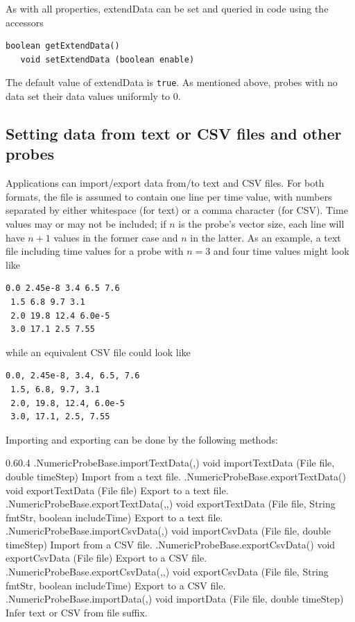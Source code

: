 As with all properties, {\sf extendData} can be set and queried in code using
the accessors
\begin{lstlisting}[]
   boolean getExtendData()
   void setExtendData (boolean enable)
\end{lstlisting}
%
The default value of {\sf extendData} is {\tt true}.  As mentioned above,
probes with no data set their data values uniformly to 0.

\subsection{Setting data from text or CSV files and other probes}

Applications can import/export data from/to text and CSV files.  For both
formats, the file is assumed to contain one line per time value, with numbers
separated by either whitespace (for text) or a comma character (for CSV). Time
values may or may not be included; if $n$ is the probe's vector size, each line
will have $n+1$ values in the former case and $n$ in the latter.  As an
example, a text file including time values for a probe with $n = 3$ and four
time values might look like
%
\begin{lstlisting}[]
 0.0 2.45e-8 3.4 6.5 7.6
 1.5 6.8 9.7 3.1
 2.0 19.8 12.4 6.0e-5
 3.0 17.1 2.5 7.55
\end{lstlisting}
%
while an equivalent CSV file could look like
%
\begin{lstlisting}[]
 0.0, 2.45e-8, 3.4, 6.5, 7.6
 1.5, 6.8, 9.7, 3.1
 2.0, 19.8, 12.4, 6.0e-5
 3.0, 17.1, 2.5, 7.55
\end{lstlisting}
%
Importing and exporting can be done by the following methods:
%
\begin{methodtable}{0.6}{0.4}
\midline
%
\methodentry
{\probes.NumericProbeBase.importTextData(,)}%
{void importTextData (File file, double timeStep)}%
{Import from a text file.}%
%
\methodentry
{\probes.NumericProbeBase.exportTextData()}%
{void exportTextData (File file)}%
{Export to a text file.}%
%
\methodentry
{\probes.NumericProbeBase.exportTextData(,,)}%
{void exportTextData (File file, String fmtStr, boolean includeTime)}%
{Export to a text file.}%
%
\methodspace{0.5em}%
\methodentry
{\probes.NumericProbeBase.importCsvData(,)}%
{void importCsvData (File file, double timeStep)}%
{Import from a CSV file.}%
%
\methodentry
{\probes.NumericProbeBase.exportCsvData()}%
{void exportCsvData (File file)}%
{Export to a CSV file.}%
%
\methodentry
{\probes.NumericProbeBase.exportCsvData(,,)}%
{void exportCsvData (File file, String fmtStr, boolean includeTime)}%
{Export to a CSV file.}%
%
\methodspace{0.5em}%
\methodentry
{\probes.NumericProbeBase.importData(,)}%
{void importData (File file, double timeStep)}%
{Infer text or CSV from file suffix.}%
%
\midline
\end{methodtable}
